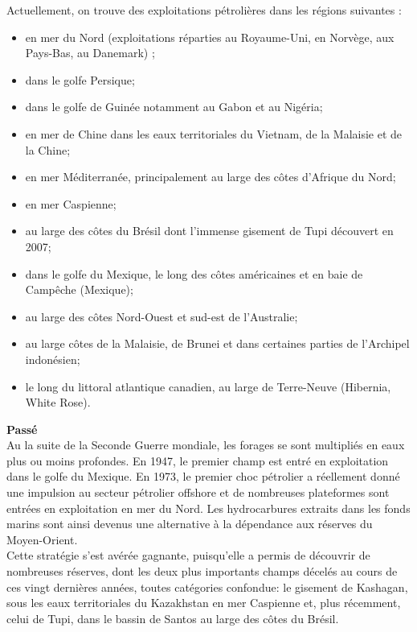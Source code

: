 \documentclass[8pt]{article}
\begin{document}
Actuellement, on trouve des exploitations pétrolières dans les régions suivantes :
\begin{itemize}
	\setlength\itemsep{-0.25em}
	\item en mer du Nord (exploitations réparties au Royaume-Uni, en Norvège, aux Pays-Bas, au Danemark) ;
	\item dans le golfe Persique;
	\item dans le golfe de Guinée notamment au Gabon et au Nigéria;
	\item en mer de Chine dans les eaux territoriales du Vietnam, de la Malaisie et de la Chine;
	\item en mer Méditerranée, principalement au large des côtes d’Afrique du Nord;
	\item en mer Caspienne;
	\item au large des côtes du Brésil dont l’immense gisement de Tupi découvert en 2007;
	\item dans le golfe du Mexique, le long des côtes américaines et en baie de Campêche (Mexique);
	\item au large des côtes Nord-Ouest et sud-est de l'Australie;
	\item au large côtes de la Malaisie, de Brunei et dans certaines parties de l'Archipel indonésien;
	\item le long du littoral atlantique canadien, au large de Terre-Neuve (Hibernia, White Rose).
\end{itemize}

\textbf{Passé}\\

Au la suite de la Seconde Guerre mondiale, les forages se sont multipliés en eaux plus ou moins profondes. En 1947, le premier champ est entré en exploitation dans le golfe du Mexique. En 1973, le premier choc pétrolier a réellement donné une impulsion au secteur pétrolier offshore et de nombreuses plateformes sont entrées en exploitation en mer du Nord. Les hydrocarbures extraits dans les fonds marins sont ainsi devenus une alternative à la dépendance aux réserves du Moyen-Orient.\\

Cette stratégie s’est avérée gagnante, puisqu’elle a permis de découvrir de nombreuses réserves, dont les deux plus importants champs décelés au cours de ces vingt dernières années, toutes catégories confondue: le gisement de Kashagan, sous les eaux territoriales du Kazakhstan en mer Caspienne et, plus récemment, celui de Tupi, dans le bassin de Santos au large des côtes du Brésil.\\
\end{document}
